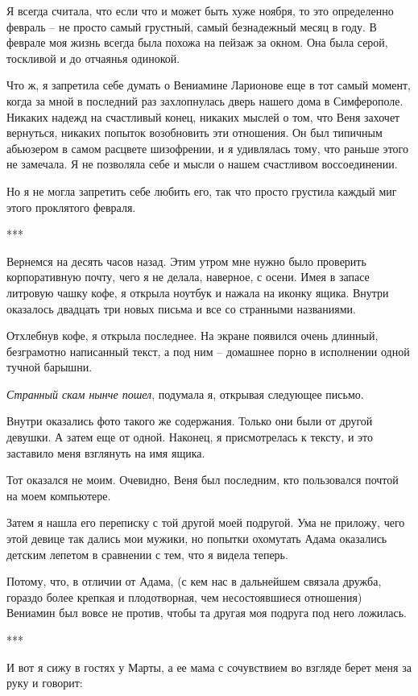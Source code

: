 \documentclass[
]{book}
\begin{document}
Я всегда считала, что если что и может быть хуже ноября, то это определенно февраль -- не просто самый грустный, самый безнадежный месяц в году. В феврале моя жизнь всегда была похожа на пейзаж за окном. Она была серой, тоскливой и до отчаянья одинокой.

Что ж, я запретила себе думать о Вениамине Ларионове еще в тот самый момент, когда за мной в последний раз захлопнулась дверь нашего дома в Симферополе. Никаких надежд на счастливый конец, никаких мыслей о том, что Веня захочет вернуться, никаких попыток возобновить эти отношения. Он был типичным абьюзером в самом расцвете шизофрении, и я удивлялась тому, что раньше этого не замечала. Я не позволяла себе и мысли о нашем счастливом воссоединении.

Но я не могла запретить себе любить его, так что просто грустила каждый миг этого проклятого февраля.

***

Вернемся на десять часов назад. Этим утром мне нужно было проверить корпоративную почту, чего я не делала, наверное, с осени. Имея в запасе литровую чашку кофе, я открыла ноутбук и нажала на иконку ящика. Внутри оказалось двадцать три новых письма и все со странными названиями.

Отхлебнув кофе, я открыла последнее. На экране появился очень длинный, безграмотно написанный текст, а под ним -- домашнее порно в исполнении одной тучной барышни.

\emph{Странный скам нынче пошел}, подумала я, открывая следующее письмо.

Внутри оказались фото такого же содержания. Только они были от другой девушки. А затем еще от одной. Наконец, я присмотрелась к тексту, и это заставило меня взглянуть на имя ящика.

Тот оказался не моим. Очевидно, Веня был последним, кто пользовался почтой на моем компьютере.

Затем я нашла его переписку с той другой моей подругой. Ума не приложу, чего этой девице так дались мои мужики, но попытки охомутать Адама оказались детским лепетом в сравнении с тем, что я видела теперь.

Потому, что, в отличии от Адама, (с кем нас в дальнейшем связала дружба, гораздо более крепкая и плодотворная, чем несостоявшиеся отношения) Вениамин был вовсе не против, чтобы та другая моя подруга под него ложилась.

***

И вот я сижу в гостях у Марты, а ее мама с сочувствием во взгляде берет меня за руку и говорит:
\end{document}
